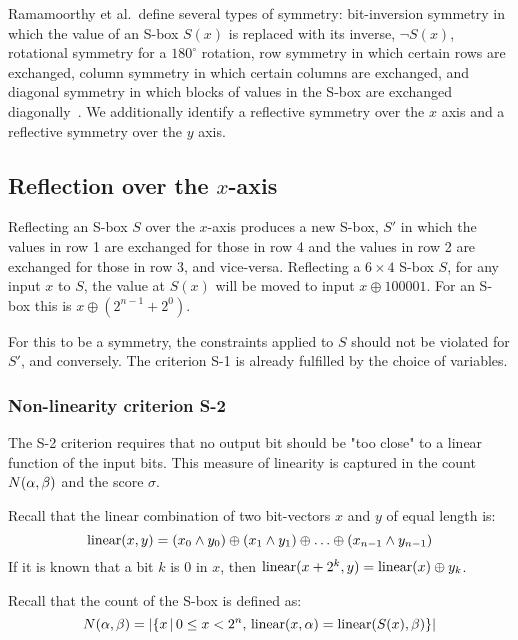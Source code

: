 Ramamoorthy et al.\ define several types of symmetry: 
bit-inversion symmetry in which the value of an S-box $S(x)$ is replaced with its inverse, $\lnot S(x)$,
rotational symmetry for a $180^{\circ}$ rotation,
row symmetry in which certain rows are exchanged,
column symmetry in which certain columns are exchanged,
and
diagonal symmetry in which blocks of values in the S-box are exchanged diagonally~\cite{sboxsymmetry}.
We additionally identify a reflective symmetry over the $x$ axis and a reflective symmetry over the $y$ axis.

\subsection{Reflection over the $x$-axis}

Reflecting an S-box $S$ over the $x$-axis produces a new S-box, $S'$ in which the values in row 1 are exchanged for those in row 4 and the values in row 2 are exchanged for those in row 3, and vice-versa.
Reflecting a $6 \times 4$ S-box $S$, for any input $x$ to $S$, the value at $S(x)$ will be moved to 
input $x \oplus 100001$. For an \nbym{} S-box this is 
$x \oplus (2^{n-1} + 2^0)$.

For this to be a symmetry, the constraints applied to $S$ should not be violated for $S'$, and conversely.
The  criterion S-1 is already fulfilled by the choice of variables.

\subsubsection{Non-linearity criterion S-2}

The S-2 criterion requires that no output bit should be "too close" to a linear function of the input bits.
This measure of linearity is captured in the count $N(\alpha,\beta)$ and the score $\sigma$.

Recall that the linear combination of two bit-vectors $x$ and $y$ of equal length is:
\[\operatorname{linear}(x,y) = (x_0 \land y_0) \oplus (x_1 \land y_1) \oplus \ldots \oplus (x_{n-1} \land y_{n-1})\]
If it is known that a bit $k$ is $0$ in $x$, then $\operatorname{linear}(x + 2^{k},y) = \operatorname{linear}(x) \oplus y_k$.

Recall that the count of the S-box is defined as:
\[N(\alpha,\beta) = \lvert\left\{x\,\middle|\,0\leq x < 2^n,\,\operatorname{linear}(x,\alpha) = \operatorname{linear}(S(x),\beta)\right\}\rvert\] 


